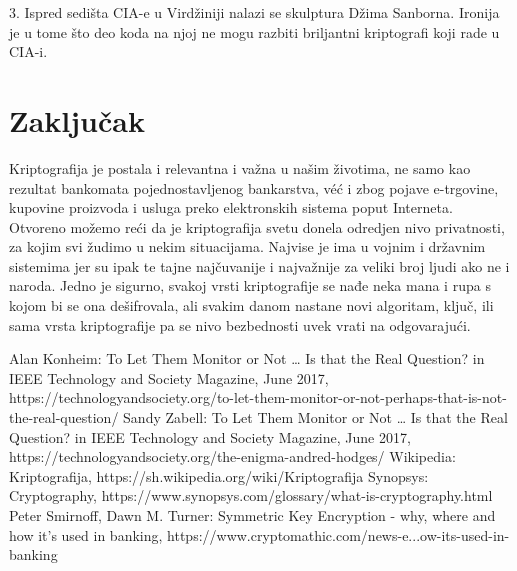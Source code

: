 \documentclass[a4paper]{article}
\begin{document}
3. Ispred sedišta CIA-e u Virdžiniji nalazi se skulptura Džima Sanborna. Ironija je u tome što deo koda na njoj ne mogu razbiti briljantni kriptografi koji rade u CIA-i.

\section{Zaključak}
\label{sec:zaključak}
Kriptografija je postala i relevantna i važna u našim životima, ne samo kao rezultat bankomata pojednostavljenog bankarstva, véć i zbog pojave e-trgovine, kupovine proizvoda i usluga preko elektronskih sistema poput Interneta.
Otvoreno možemo reći da je kriptografija svetu donela odredjen nivo privatnosti, za kojim svi žudimo u nekim situacijama. Najvise je ima u vojnim i državnim sistemima jer su ipak te tajne najčuvanije i najvažnije za veliki broj ljudi ako ne i naroda. Jedno je sigurno, svakoj vrsti kriptografije se nađe neka mana i rupa s kojom bi se ona dešifrovala, ali
svakim danom nastane novi algoritam, ključ, ili sama vrsta kriptografije pa se nivo bezbednosti uvek vrati na odgovarajući.

\newpage

\appendix

\iffalse


\fi

\begin{thebibliography}{21}
 Alan Konheim: To Let Them Monitor or Not … Is that the Real Question? in IEEE Technology and Society Magazine, June 2017, https://technologyandsociety.org/to-let-them-monitor-or-not-perhaps-that-is-not-the-real-question/
 Sandy Zabell: To Let Them Monitor or Not … Is that the Real Question? in IEEE Technology and Society Magazine, June 2017, https://technologyandsociety.org/the-enigma-andred-hodges/
 Wikipedia: Kriptografija, https://sh.wikipedia.org/wiki/Kriptografija
 Synopsys: Cryptography, https://www.synopsys.com/glossary/what-is-cryptography.html
 Peter Smirnoff, Dawn M. Turner: Symmetric Key Encryption - why, where and how it’s used in banking, https://www.cryptomathic.com/news-e...ow-its-used-in-banking 

\end{thebibliography}
\end{document}
